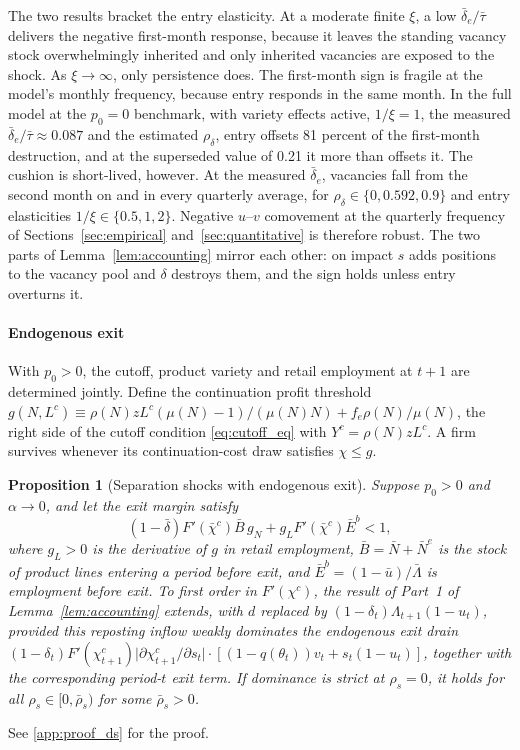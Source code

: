\documentclass[authoryear, review, 12pt]{elsarticle}
\newtheorem{proposition}{Proposition}
\begin{document}
The two results bracket the entry elasticity. At a moderate finite $\xi$, a low
$\bar\delta_e/\bar\tau$ delivers the negative first-month response, because it leaves the
standing vacancy stock overwhelmingly inherited and only inherited vacancies are exposed to
the shock. As $\xi\to\infty$, only persistence does. The first-month sign is fragile at the
model's monthly frequency, because entry responds in the same month. In the full model at
the $p_0=0$ benchmark, with variety effects active, $1/\xi=1$, the measured
$\bar\delta_e/\bar\tau\approx0.087$ and the estimated $\rho_\delta$, entry offsets 81 percent
of the first-month destruction, and at the superseded value of 0.21 it more than offsets it.
The cushion is short-lived, however. At the measured $\bar\delta_e$, vacancies fall from the
second month on and in every quarterly average, for $\rho_\delta\in\{0,0.592,0.9\}$ and entry
elasticities $1/\xi\in\{0.5,1,2\}$. Negative $u$--$v$ comovement at the quarterly frequency
of Sections~\ref{sec:empirical} and~\ref{sec:quantitative} is therefore robust. The two
parts of Lemma~\ref{lem:accounting} mirror each other: on impact $s$ adds positions to the
vacancy pool and $\delta$ destroys them, and the sign holds unless entry overturns it.

\paragraph{Endogenous exit}
With $p_0>0$, the cutoff, product variety and retail employment at $t+1$ are determined
jointly. Define the continuation profit threshold
$g(N,L^c)\equiv\rho(N)zL^c(\mu(N)-1)/(\mu(N)N)+f_e\rho(N)/\mu(N)$, the right side of the
cutoff condition \eqref{eq:cutoff_eq} with $Y^c=\rho(N)zL^c$. A firm survives whenever its
continuation-cost draw satisfies $\chi\leq g$.

\begin{proposition}[Separation shocks with endogenous exit]\label{prop:exit_s}
Suppose $p_0>0$ and $\alpha\to0$, and let the exit margin satisfy
\begin{equation}\label{eq:exit_cond}
	(1-\bar\delta)F'(\bar\chi^c)\bar{B}\,g_N
	+g_LF'(\bar\chi^c)\bar{E}^b<1,
\end{equation}
where $g_L>0$ is the derivative of $g$ in retail employment, $\bar{B}=\bar{N}+\bar{N}^e$ is
the stock of product lines entering a period before exit, and
$\bar{E}^b=(1-\bar{u})/\bar\Lambda$ is employment before exit. To first order in
$F'(\chi^c)$, the result of Part~1 of Lemma~\ref{lem:accounting} extends, with $d$ replaced
by $(1-\delta_t)\Lambda_{t+1}(1-u_t)$, provided this reposting inflow weakly dominates the
endogenous exit drain $(1-\delta_t)F'(\chi^c_{t+1})\lvert\partial\chi^c_{t+1}/\partial s_t\rvert
\cdot[(1-q(\theta_t))v_t+s_t(1-u_t)]$, together with the corresponding period-$t$ exit term.
If dominance is strict at $\rho_s=0$, it holds for all $\rho_s\in[0,\bar\rho_s)$ for some
$\bar\rho_s>0$.
\end{proposition}
\noindent See \ref{app:proof_ds} for the proof.
\end{document}
